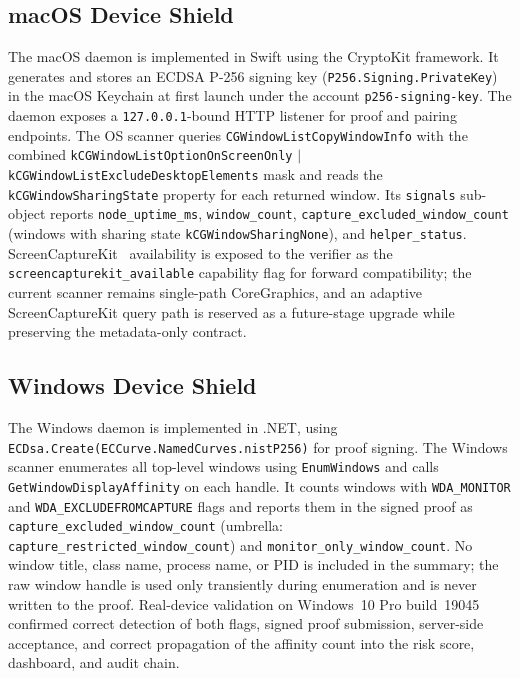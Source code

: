 \documentclass[conference]{IEEEtran}
\begin{document}
\subsection{macOS Device Shield}

The macOS daemon is implemented in Swift using the CryptoKit framework. It generates and stores an ECDSA P-256 signing key (\texttt{P256.Signing.PrivateKey}) in the macOS Keychain at first launch under the account \texttt{p256-signing-key}. The daemon exposes a \texttt{127.0.0.1}-bound HTTP listener for proof and pairing endpoints. The OS scanner queries \texttt{CGWindowListCopyWindowInfo} with the combined \texttt{kCGWindowListOptionOnScreenOnly} $|$ \texttt{kCGWindowListExcludeDesktopElements} mask and reads the \texttt{kCGWindowSharingState} property for each returned window. Its \texttt{signals} sub-object reports \texttt{node\_uptime\_ms}, \texttt{window\_count}, \texttt{capture\_excluded\_window\_count} (windows with sharing state \texttt{kCGWindowSharingNone}), and \texttt{helper\_status}. ScreenCaptureKit~\cite{apple2025screencapturekit} availability is exposed to the verifier as the \texttt{screencapturekit\_available} capability flag for forward compatibility; the current scanner remains single-path CoreGraphics, and an adaptive ScreenCaptureKit query path is reserved as a future-stage upgrade while preserving the metadata-only contract.

\subsection{Windows Device Shield}

The Windows daemon is implemented in .NET, using \texttt{ECDsa.Create(ECCurve.NamedCurves.nistP256)} for proof signing. The Windows scanner enumerates all top-level windows using \texttt{EnumWindows} and calls \texttt{GetWindowDisplayAffinity} on each handle. It counts windows with \texttt{WDA\_MONITOR} and \texttt{WDA\_EXCLUDEFROMCAPTURE} flags and reports them in the signed proof as \texttt{capture\_excluded\_window\_count} (umbrella: \texttt{capture\_restricted\_window\_count}) and \texttt{monitor\_only\_window\_count}. No window title, class name, process name, or PID is included in the summary; the raw window handle is used only transiently during enumeration and is never written to the proof. Real-device validation on Windows~10 Pro build~19045 confirmed correct detection of both flags, signed proof submission, server-side acceptance, and correct propagation of the affinity count into the risk score, dashboard, and audit chain.
\end{document}
